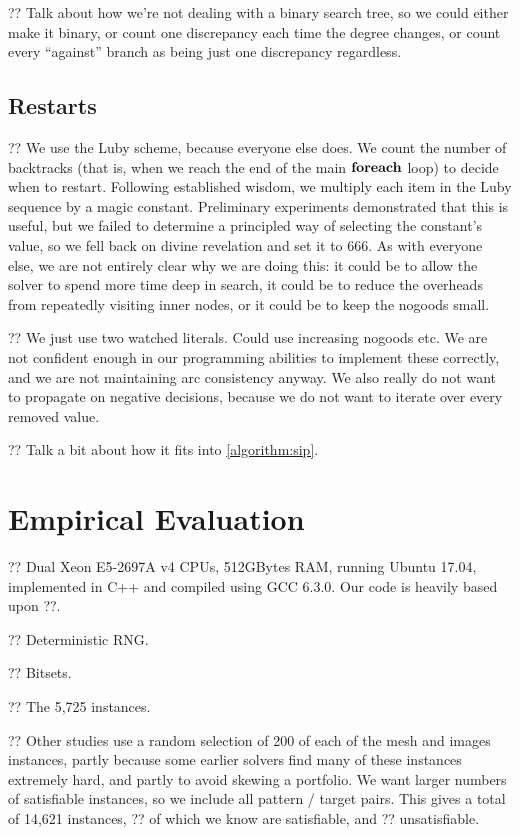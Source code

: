 \documentclass{article}
\begin{document}
?? Talk about how we're not dealing with a binary search tree, so we could either make it binary, or
count one discrepancy each time the degree changes, or count every ``against'' branch as being just
one discrepancy regardless.

\subsection{Restarts}

?? We use the Luby scheme, because everyone else does. We count the number of backtracks (that is,
when we reach the end of the main $\KwSty{foreach}$ loop) to decide when to restart. Following
established wisdom, we multiply each item in the Luby sequence by a magic constant. Preliminary
experiments demonstrated that this is useful, but we failed to determine a principled way of
selecting the constant's value, so we fell back on divine revelation and set it to 666. As with
everyone else, we are not entirely clear why we are doing this: it could be to allow the solver to
spend more time deep in search, it could be to reduce the overheads from repeatedly visiting inner
nodes, or it could be to keep the nogoods small.

?? We just use two watched literals. Could use increasing nogoods etc. We are not confident enough
in our programming abilities to implement these correctly, and we are not maintaining arc
consistency anyway. We also really do not want to propagate on negative decisions, because we do not
want to iterate over every removed value.

?? Talk a bit about how it fits into \cref{algorithm:sip}.

\section{Empirical Evaluation}

?? Dual Xeon E5-2697A v4 CPUs, 512GBytes RAM, running Ubuntu 17.04, implemented in C++ and compiled
using GCC 6.3.0. Our code is heavily based upon ??.

?? Deterministic RNG.

?? Bitsets.

?? The 5,725 instances.

?? Other studies use a random selection of 200 of each of the mesh and images instances, partly
because some earlier solvers find many of these instances extremely hard, and partly to avoid
skewing a portfolio. We want larger numbers of satisfiable instances, so we include all pattern /
target pairs. This gives a total of 14,621 instances, ?? of which we know are satisfiable, and ??
unsatisfiable.
\end{document}
